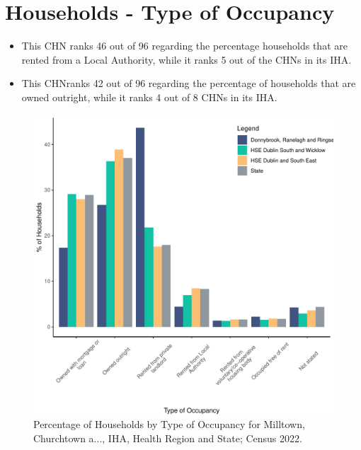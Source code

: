 \documentclass{article}
\begin{document}
\section{Households - Type of Occupancy}\label{sect:Households}
\begin{itemize}
\item This CHN ranks  46 out of 96 regarding the percentage households that are rented from a Local Authority, while it ranks  5 out of the CHNs in its IHA. 
\item This CHNranks  42 out of 96 regarding the percentage of households that are owned outright, while it ranks   4 out of 8 CHNs in its IHA.
\end{itemize}
\begin{figure}[H]
	\centering
	\includegraphics[width = 140mm]{../figures/HouseholdsED.pdf}
	\caption{Percentage of Households by Type of Occupancy for Milltown, Churchtown a..., IHA, Health Region and State; Census 2022.}
	\label{fig:vbnv}
	\end{figure}
\end{document}
